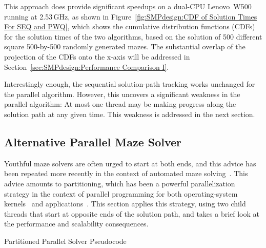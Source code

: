 This approach does provide significant speedups on a dual-CPU
Lenovo\mytexttrademark\ W500
running at 2.53\,GHz, as shown in
Figure~\ref{fig:SMPdesign:CDF of Solution Times For SEQ and PWQ},
which shows the cumulative distribution functions (CDFs) for the solution
times of the two algorithms, based on the solution of 500 different square
500-by-500 randomly generated mazes.
The substantial overlap
of the projection of the CDFs onto the x-axis will be addressed in
Section~\ref{sec:SMPdesign:Performance Comparison I}.

Interestingly enough, the sequential solution-path tracking works unchanged
for the parallel algorithm.
However, this uncovers a significant weakness in the parallel algorithm:
At most one thread may be making progress along the solution path at
any given time.
This weakness is addressed in the next section.

\subsection{Alternative Parallel Maze Solver}
\label{sec:SMPdesign:Alternative Parallel Maze Solver}

Youthful maze solvers are often urged to start at both ends, and
this advice has been repeated more recently in the context of automated
maze solving~\cite{UMD:CMSC433maze}.
This advice amounts to partitioning, which has been a powerful
parallelization strategy
in the context of parallel programming for both operating-system
kernels~\cite{Beck85,Inman85} and
applications~\cite{DavidAPatterson2010TroubleMulticore}.
This section applies this strategy, using two child threads that start
at opposite ends of the solution path, and takes a brief look at the
performance and scalability consequences.

\begin{listing}[tbp]
\begin{linelabel}
\end{linelabel}
\caption{Partitioned Parallel Solver Pseudocode}
\label{lst:SMPdesign:Partitioned Parallel Solver Pseudocode}
\end{listing}

